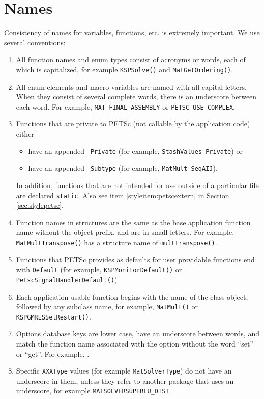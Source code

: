 \section{Names}\label{sec:stylenames}
Consistency of names for variables, functions, etc. is extremely
important.
We use several conventions:
\begin{enumerate}
\item All function names and enum types consist of acronyms or words, each of
  which is capitalized, for example \lstinline{KSPSolve()} and
      \lstinline{MatGetOrdering()}.
\item All enum elements and macro variables are named with all capital letters. When
      they consist of several complete words, there is an underscore between each word. 
      For example, \lstinline{MAT_FINAL_ASSEMBLY} or \lstinline{PETSC_USE_COMPLEX}.
\item Functions that are private to PETSc (not callable by the
      application code) either
      \begin{itemize}
        \item have an appended \lstinline{_Private} (for example,
           \lstinline{StashValues_Private}) or
        \item have an appended \lstinline{_Subtype} (for example,
           \lstinline{MatMult_SeqAIJ}).
      \end{itemize}

      In addition, functions that are not intended for use outside
      of a particular file are declared \lstinline{static}. 
      Also see item \ref{styleitem:petscextern} in Section \ref{sec:stylepetsc}.
\item Function names in structures are the same as the base application
      function name without the object prefix, and are in small letters.
      For example, \lstinline{MatMultTranspose()} has a structure name of
      \lstinline{multtranspose()}.
\item Functions that PETSc provides as defaults for user providable functions end with \lstinline{Default} (for example, \lstinline{KSPMonitorDefault()} or \lstinline{PetscSignalHandlerDefault()})
\item Each application usable function begins with the name of the class object, followed by any subclass name,
  for example,  \lstinline{MatMult()} or \lstinline{KSPGMRESSetRestart()}.
\item Options database keys are lower case, have an underscore between words, and match the function name associated with the option without the word ``set'' or ``get''.
For example, .
\item Specific \lstinline{XXXType} values (for example \lstinline{MatSolverType}) do not have an underscore in them, unless they refer to another package that uses an underscore, for example \lstinline{MATSOLVERSUPERLU_DIST}.
\end{enumerate}


